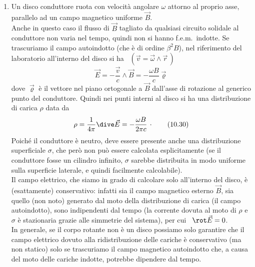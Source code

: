 \begin{enumerate}
  \item Un disco conduttore ruota con velocit\`a angolare $\omega$ attorno al
    proprio asse, parallelo ad un campo magnetico uniforme $\vec B$.\\
    Anche in questo caso il flusso di $\vec B$ tagliato da qualsiasi circuito
    solidale al conduttore non varia nel tempo, quindi non si hanno
    f.e.m.\ indotte. Se trascuriamo il campo autoindotto (che \`e di ordine
    $\beta^2B$), nel riferimento del laboratorio all'interno del disco si ha
    \ $(\vec v=\vec\omega\wedge\vec r\,)$
    \begin{equation}
      \vec E=-\frac{\vec v}{c}\wedge\vec B=-\frac{\omega B}{c}\vec\varrho
      \tag{10.29}
    \end{equation}
    dove $\vec\varrho$ \`e il vettore nel piano ortogonale a $\vec B$ dall'asse
    di rotazione al generico punto del conduttore. Quindi nei punti interni al
    disco si ha una distribuzione di carica $\rho$ data da
    \begin{equation}
      \rho=\frac{1}{4\pi}\dive\vec E=-\frac{\omega B}{2\pi c}\,\cdot
      \tag{10.30}
    \end{equation}
    Poich\'e il conduttore \`e neutro, deve essere presente anche una
    distribuzione superficiale $\sigma$, che per\`o non pu\`o essere calcolata
    esplicitamente (se il conduttore fosse un cilindro infinito, $\sigma$
    sarebbe distribuita in modo uniforme sulla superficie laterale, e quindi
    facilmente calcolabile).\\
    Il campo elettrico, che siamo in grado di calcolare solo all'interno del
    disco, \`e (esattamente) conservativo: infatti sia il campo magnetico
    esterno $\vec B$, sia quello (non noto) generato dal moto della
    distribuzione di carica (il campo autoindotto), sono indipendenti dal tempo
    (la corrente dovuta al moto di $\rho$ e $\sigma$ \`e stazionaria grazie alle
    simmetrie del sistema), per cui \ $\rot\vec E=0$.\\
    In generale, se il corpo rotante non \`e un disco possiamo solo garantire
    che il campo elettrico dovuto alla ridistribuzione delle cariche \`e
    conservativo (ma non statico) solo se trascuriamo il campo magnetico
    autoindotto che, a causa del moto delle cariche indotte, potrebbe dipendere
    dal tempo.


\end{enumerate}
